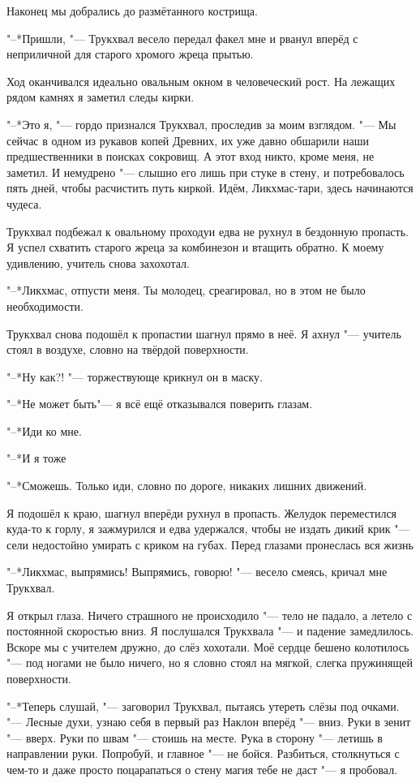 Наконец мы добрались до размётанного кострища.

"--*Пришли, "--- Трукхвал весело передал факел мне и рванул вперёд с неприличной для старого хромого жреца прытью.

Ход оканчивался идеально овальным окном в человеческий рост.
На лежащих рядом камнях я заметил следы кирки.

"--*Это я, "--- гордо признался Трукхвал, проследив за моим взглядом.
"--- Мы сейчас в одном из рукавов копей Древних, их уже давно обшарили наши предшественники в поисках сокровищ.
А этот вход никто, кроме меня, не заметил.
И немудрено "--- слышно его лишь при стуке в стену, и потребовалось пять дней, чтобы расчистить путь киркой.
Идём, Ликхмас-тари, здесь начинаются чудеса.

Трукхвал подбежал к овальному проходу\ldotst и едва не рухнул в бездонную пропасть.
Я успел схватить старого жреца за комбинезон и втащить обратно.
К моему удивлению, учитель снова захохотал.

"--*Ликхмас, отпусти меня.
Ты молодец, среагировал, но в этом не было необходимости.

Трукхвал снова подошёл к пропасти\ldotst и шагнул прямо в неё.
Я ахнул "--- учитель стоял в воздухе, словно на твёрдой поверхности.

"--*Ну как?! "--- торжествующе крикнул он в маску.

"--*Не может быть\ldotst "--- я всё ещё отказывался поверить глазам.

"--*Иди ко мне.

"--*И я тоже\ldotsq

"--*Сможешь.
Только иди, словно по дороге, никаких лишних движений.

Я подошёл к краю, шагнул вперёд\ldotst и рухнул в пропасть.
Желудок переместился куда-то к горлу, я зажмурился и едва удержался, чтобы не издать дикий крик "--- сели недостойно умирать с криком на губах.
Перед глазами пронеслась вся жизнь\ldotst

"--*Ликхмас, выпрямись!
Выпрямись, говорю! "--- весело смеясь, кричал мне Трукхвал.

Я открыл глаза.
Ничего страшного не происходило "--- тело не падало, а летело с постоянной скоростью вниз.
Я послушался Трукхвала "--- и падение замедлилось.
Вскоре мы с учителем дружно, до слёз хохотали.
Моё сердце бешено колотилось "--- под ногами не было ничего, но я словно стоял на мягкой, слегка пружинящей поверхности.

"--*Теперь слушай, "--- заговорил Трукхвал, пытаясь утереть слёзы под очками.
"--- Лесные духи, узнаю себя в первый раз\ldotst
Наклон вперёд "--- вниз.
Руки в зенит "--- вверх.
Руки по швам "--- стоишь на месте.
Рука в сторону "--- летишь в направлении руки.
Попробуй, и главное "--- не бойся.
Разбиться, столкнуться с чем-то и даже просто поцарапаться о стену магия тебе не даст "--- я пробовал.

